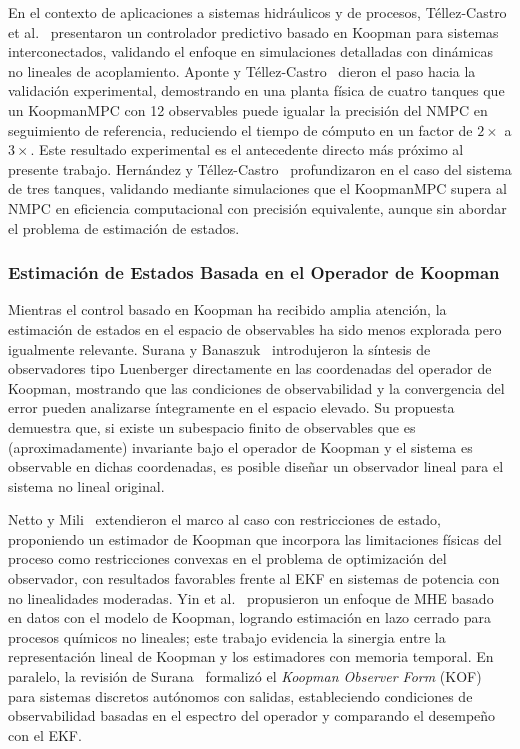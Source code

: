 \documentclass[12pt,letterpaper]{article}
\begin{document}
En el contexto de aplicaciones a sistemas hidráulicos y de procesos,
Téllez-Castro et al.~\cite{tellez2022} presentaron un controlador predictivo basado
en Koopman para sistemas interconectados, validando el enfoque en simulaciones
detalladas con dinámicas no lineales de acoplamiento. Aponte y
Téllez-Castro~\cite{aponte2024} dieron el paso hacia la validación experimental,
demostrando en una planta física de cuatro tanques que un KoopmanMPC con 12
observables puede igualar la precisión del NMPC en seguimiento de referencia,
reduciendo el tiempo de cómputo en un factor de $2\times$ a $3\times$. Este resultado
experimental es el antecedente directo más próximo al presente trabajo. Hernández y
Téllez-Castro~\cite{hernandez2026} profundizaron en el caso del sistema de tres
tanques, validando mediante simulaciones que el KoopmanMPC supera al NMPC en
eficiencia computacional con precisión equivalente, aunque sin abordar el problema de
estimación de estados.

\subsubsection*{Estimación de Estados Basada en el Operador de Koopman}

Mientras el control basado en Koopman ha recibido amplia atención, la estimación de
estados en el espacio de observables ha sido menos explorada pero igualmente
relevante. Surana y Banaszuk~\cite{surana2016} introdujeron la síntesis de
observadores tipo Luenberger directamente en las coordenadas del operador de
Koopman, mostrando que las condiciones de observabilidad y la convergencia del error
pueden analizarse íntegramente en el espacio elevado. Su propuesta demuestra que, si
existe un subespacio finito de observables que es (aproximadamente) invariante bajo
el operador de Koopman y el sistema es observable en dichas coordenadas, es posible
diseñar un observador lineal para el sistema no lineal original.

Netto y Mili~\cite{netto2020} extendieron el marco al caso con restricciones de
estado, proponiendo un estimador de Koopman que incorpora las limitaciones físicas
del proceso como restricciones convexas en el problema de optimización del
observador, con resultados favorables frente al EKF en sistemas de potencia con no
linealidades moderadas. Yin et al.~\cite{yin2023} propusieron un enfoque de MHE
basado en datos con el modelo de Koopman, logrando estimación en lazo cerrado para
procesos químicos no lineales; este trabajo evidencia la sinergia entre la
representación lineal de Koopman y los estimadores con memoria temporal. En
paralelo, la revisión de Surana~\cite{surana2020} formalizó el
\textit{Koopman Observer Form} (KOF) para sistemas discretos autónomos con salidas,
estableciendo condiciones de observabilidad basadas en el espectro del operador y
comparando el desempeño con el EKF.
\end{document}
